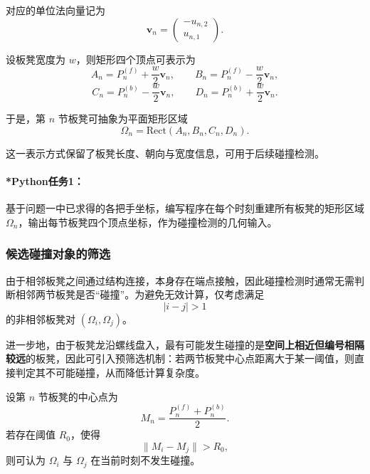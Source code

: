 \documentclass[12pt,a4paper]{ctexart}
\begin{document}
对应的单位法向量记为
\begin{equation}
\bm{v}_n=
\begin{pmatrix}
-u_{n,2}\\
u_{n,1}
\end{pmatrix}.
\end{equation}

设板凳宽度为 $w$，则矩形四个顶点可表示为
\begin{equation}
A_n=P_n^{(f)}+\frac{w}{2}\bm{v}_n,
\qquad
B_n=P_n^{(f)}-\frac{w}{2}\bm{v}_n,
\end{equation}
\begin{equation}
C_n=P_n^{(b)}-\frac{w}{2}\bm{v}_n,
\qquad
D_n=P_n^{(b)}+\frac{w}{2}\bm{v}_n.
\end{equation}

于是，第 $n$ 节板凳可抽象为平面矩形区域
\begin{equation}
\Omega_n=\text{Rect}(A_n,B_n,C_n,D_n).
\end{equation}

这一表示方式保留了板凳长度、朝向与宽度信息，可用于后续碰撞检测。

\paragraph{*Python任务1：}
基于问题一中已求得的各把手坐标，编写程序在每个时刻重建所有板凳的矩形区域 $\Omega_n$，输出每节板凳四个顶点坐标，作为碰撞检测的几何输入。

\subsubsection{候选碰撞对象的筛选}
由于相邻板凳之间通过结构连接，本身存在端点接触，因此碰撞检测时通常无需判断相邻两节板凳是否“碰撞”。为避免无效计算，仅考虑满足
\begin{equation}
|i-j|>1
\end{equation}
的非相邻板凳对 $(\Omega_i,\Omega_j)$。

进一步地，由于板凳龙沿螺线盘入，最有可能发生碰撞的是\textbf{空间上相近但编号相隔较远}的板凳，因此可引入预筛选机制：若两节板凳中心点距离大于某一阈值，则直接判定其不可能碰撞，从而降低计算复杂度。

设第 $n$ 节板凳的中心点为
\begin{equation}
M_n=\frac{P_n^{(f)}+P_n^{(b)}}{2}.
\end{equation}
若存在阈值 $R_0$，使得
\begin{equation}
\|M_i-M_j\|>R_0,
\end{equation}
则可认为 $\Omega_i$ 与 $\Omega_j$ 在当前时刻不发生碰撞。
\end{document}
